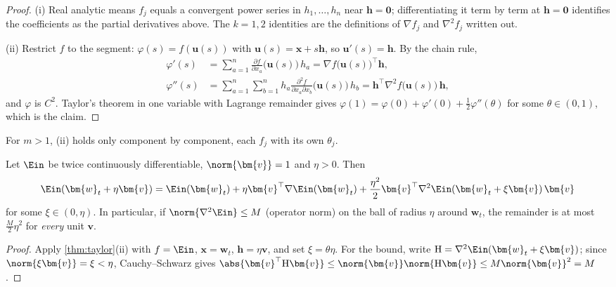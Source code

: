 \begin{proof}
    (i) Real analytic means \(f_j\) equals a convergent power series in
    \(h_1, \dots, h_n\) near \(\bm{h} = \bm{0}\); differentiating it term by
    term at \(\bm{h} = \bm{0}\) identifies the coefficients as the partial
    derivatives above. The \(k = 1, 2\) identities are the definitions of
    \(\nabla f_j\) and \(\nabla^2 f_j\) written out.

    (ii) Restrict \(f\) to the segment: \(\varphi(s) = f(\bm{u}(s))\) with
    \(\bm{u}(s) = \bm{x} + s \bm{h}\), so \(\bm{u}'(s) = \bm{h}\). By the
    chain rule,
    \begin{align*}
        \varphi'(s) &= \sum_{a=1}^n \frac{\partial f}{\partial x_a}
        \bigl( \bm{u}(s) \bigr) \, h_a = \nabla f \bigl( \bm{u}(s)
        \bigr)^\top \bm{h} ,\\
        \varphi''(s) &= \sum_{a=1}^n \sum_{b=1}^n h_a \frac{\partial^2
        f}{\partial x_a \partial x_b} \bigl( \bm{u}(s) \bigr) \, h_b =
        \bm{h}^\top \nabla^2 f \bigl( \bm{u}(s) \bigr) \, \bm{h} ,
    \end{align*}
    and \(\varphi\) is \(C^2\). Taylor's theorem in one variable with
    Lagrange remainder gives \(\varphi(1) = \varphi(0) + \varphi'(0) +
    \frac{1}{2} \varphi''(\theta)\) for some \(\theta \in (0, 1)\), which is
    the claim.
\end{proof}

For \(m > 1\), (ii) holds only component by component, each \(f_j\) with its
own \(\theta_j\).

\begin{corollary}\label{cor:taylor-dir}
    Let \(\Ein\) be twice continuously differentiable, \(\norm{\bm{v}} = 1\)
    and \(\eta > 0\). Then
    \[
        \Ein(\bm{w}_t + \eta \bm{v}) = \Ein(\bm{w}_t) + \eta \bm{v}^\top
        \nabla \Ein(\bm{w}_t) + \frac{\eta^2}{2} \bm{v}^\top \nabla^2
        \Ein(\bm{w}_t + \xi \bm{v}) \, \bm{v}
    \]
    for some \(\xi \in (0, \eta)\). In particular, if \(\norm{\nabla^2
    \Ein} \le M\) (operator norm) on the ball of radius \(\eta\) around
    \(\bm{w}_t\), the remainder is at most \(\frac{M}{2} \eta^2\) for
    \emph{every} unit \(\bm{v}\).
\end{corollary}

\begin{proof}
    Apply \autoref{thm:taylor}(ii) with \(f = \Ein\), \(\bm{x} = \bm{w}_t\),
    \(\bm{h} = \eta \bm{v}\), and set \(\xi = \theta \eta\). For the bound,
    write \(\mathrm{H} = \nabla^2 \Ein(\bm{w}_t + \xi \bm{v})\); since
    \(\norm{\xi \bm{v}} = \xi < \eta\), Cauchy--Schwarz gives
    \(\abs{\bm{v}^\top \mathrm{H} \bm{v}} \le \norm{\bm{v}} \norm{\mathrm{H}
    \bm{v}} \le M \norm{\bm{v}}^2 = M\).
\end{proof}

